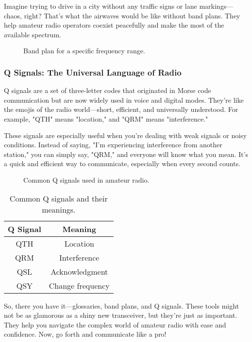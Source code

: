 Imagine trying to drive in a city without any traffic signs or lane markings—chaos, right? That’s what the airwaves would be like without band plans. They help amateur radio operators coexist peacefully and make the most of the available spectrum.

\begin{figure}[h!]
    \centering
    \caption{Band plan for a specific frequency range.}
    \label{fig:band-plan}
\end{figure}

\subsubsection*{Q Signals: The Universal Language of Radio}
Q signals are a set of three-letter codes that originated in Morse code communication but are now widely used in voice and digital modes. They’re like the emojis of the radio world—short, efficient, and universally understood. For example, "QTH" means "location," and "QRM" means "interference."

These signals are especially useful when you’re dealing with weak signals or noisy conditions. Instead of saying, "I’m experiencing interference from another station," you can simply say, "QRM," and everyone will know what you mean. It’s a quick and efficient way to communicate, especially when every second counts.

\begin{figure}[h!]
    \centering
    \caption{Common Q signals used in amateur radio.}
    \label{fig:q-signals}
\end{figure}

\begin{table}[h!]
    \centering
    \begin{tabular}{|c|c|}
        \hline
        \textbf{Q Signal} & \textbf{Meaning} \\
        \hline
        QTH & Location \\
        QRM & Interference \\
        QSL & Acknowledgment \\
        QSY & Change frequency \\
        \hline
    \end{tabular}
    \caption{Common Q signals and their meanings.}
    \label{tab:q-signals}
\end{table}

So, there you have it—glossaries, band plans, and Q signals. These tools might not be as glamorous as a shiny new transceiver, but they’re just as important. They help you navigate the complex world of amateur radio with ease and confidence. Now, go forth and communicate like a pro!

